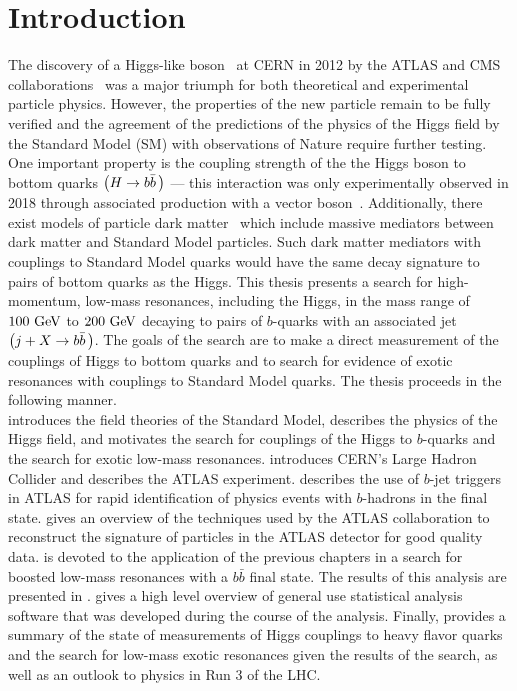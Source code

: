\chapter{Introduction}\label{chapter:introduction}

The discovery of a Higgs-like boson~\cite{Higgs:1964ia,Higgs:1964pj,Higgs:1966ev,Englert:1964et,Guralnik:1964eu} at CERN in 2012 by the \Gls{ATLAS} and CMS collaborations~\cite{Aad:2012tfa,Chatrchyan:2012xdj} was a major triumph for both theoretical and experimental particle physics.
However, the properties of the new particle remain to be fully verified and the agreement of the predictions of the physics of the Higgs field by the \Gls{Standard Model} (SM) with observations of Nature require further testing.
One important property is the coupling strength of the the Higgs boson to bottom quarks $\left(H \to b\bar{b}\,\right)$ --- this interaction was only experimentally observed in 2018 through associated production with a vector boson~\cite{Aaboud:2018zhk,CMS:2018abb}.
Additionally, there exist models of particle dark matter~\cite{Abdallah:2015ter} which include massive mediators between dark matter and Standard Model particles.
Such \glspl{dark matter mediator} with couplings to Standard Model quarks would have the same decay signature to pairs of bottom quarks as the Higgs.
This thesis presents a search for high-momentum, low-mass resonances, including the Higgs, in the mass range of $100~\mathrm{GeV}$ to $200~\mathrm{GeV}$ decaying to pairs of $b$-quarks with an associated jet $\left(j + X \to b\bar{b}\,\right)$.
The goals of the search are to make a direct measurement of the couplings of Higgs to bottom quarks and to search for evidence of exotic resonances with couplings to Standard Model quarks.
The thesis proceeds in the following manner.\\

 introduces the field theories of the Standard Model, describes the physics of the Higgs field, and motivates the search for couplings of the Higgs to $b$-quarks and the search for exotic low-mass resonances.
 introduces CERN's Large Hadron Collider and  describes the ATLAS experiment.
 describes the use of $b$-jet triggers in ATLAS for rapid identification of physics events with $b$-hadrons in the final state.
 gives an overview of the techniques used by the ATLAS collaboration to reconstruct the signature of particles in the ATLAS detector for good quality data.
 is devoted to the application of the previous chapters in a search for boosted low-mass resonances with a $b\bar{b}$ final state.
The results of this analysis are presented in .
 gives a high level overview of general use statistical analysis software that was developed during the course of the analysis.
Finally,  provides a summary of the state of measurements of Higgs couplings to heavy flavor quarks and the search for low-mass exotic resonances given the results of the search, as well as an outlook to physics in Run 3 of the LHC.

